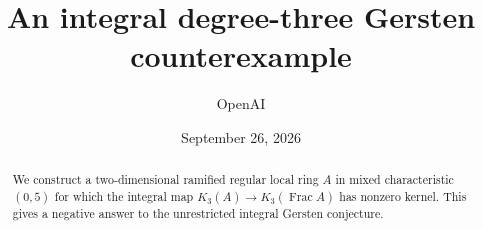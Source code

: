 \documentclass[11pt]{article}
\title{An integral degree-three Gersten counterexample}
\author{OpenAI}
\date{September 26, 2026}
\theoremstyle{remark}
\DeclareMathOperator{\Frac}{Frac}
\begin{document}
\maketitle
\begin{abstract}
We construct a two-dimensional ramified regular local ring $A$ in mixed
characteristic $(0,5)$ for which the integral map
$K_3(A)\to K_3(\Frac A)$ has nonzero kernel. This gives a negative
answer to the unrestricted integral Gersten conjecture.
\end{abstract}







\end{document}
